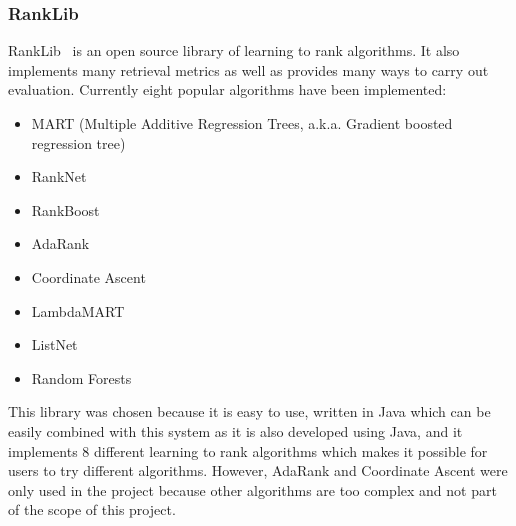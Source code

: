 \subsubsection{RankLib}\label{section:rankLib}
RankLib~\cite{ranklib} is an open source library of learning to rank algorithms. It also implements many retrieval metrics as well as provides many ways to carry out evaluation.
Currently eight popular algorithms have been implemented:
\begin{itemize}
 \item MART (Multiple Additive Regression Trees, a.k.a. Gradient boosted regression tree)
 \item RankNet
 \item RankBoost
 \item AdaRank
 \item Coordinate Ascent
 \item LambdaMART
 \item ListNet
 \item Random Forests
\end{itemize}

This library was chosen because it is easy to use, written in Java which can be easily combined with this system as it is also developed using Java, and
it implements 8 different learning to rank algorithms which makes it possible for users to try different algorithms.
However, AdaRank and Coordinate Ascent were only used in the project because other algorithms are too complex and not part of the scope of this project.

